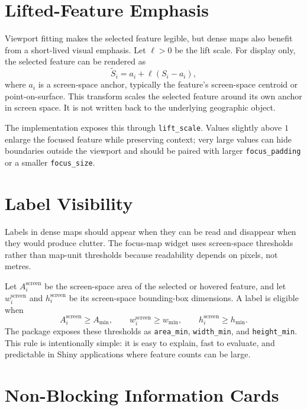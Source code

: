 \documentclass[12pt, a4paper]{article}
\numberwithin{equation}{section}
\newcommand{\screen}{\operatorname{screen}}
\begin{document}
\section{Lifted-Feature Emphasis}

Viewport fitting makes the selected feature legible, but dense maps also benefit from a short-lived visual emphasis. Let $\ell > 0$ be the lift scale. For display only, the selected feature can be rendered as
\begin{equation}
  \widetilde{S}_i = a_i + \ell \left(S_i - a_i\right),
  \label{eq:lift}
\end{equation}
where $a_i$ is a screen-space anchor, typically the feature's screen-space centroid or point-on-surface. This transform scales the selected feature around its own anchor in screen space. It is not written back to the underlying geographic object.

The implementation exposes this through \texttt{lift\_scale}. Values slightly above $1$ enlarge the focused feature while preserving context; very large values can hide boundaries outside the viewport and should be paired with larger \texttt{focus\_padding} or a smaller \texttt{focus\_size}.

\section{Label Visibility}

Labels in dense maps should appear when they can be read and disappear when they would produce clutter. The focus-map widget uses screen-space thresholds rather than map-unit thresholds because readability depends on pixels, not metres.

Let $A_i^{\screen}$ be the screen-space area of the selected or hovered feature, and let $w_i^{\screen}$ and $h_i^{\screen}$ be its screen-space bounding-box dimensions. A label is eligible when
\begin{equation}
  A_i^{\screen} \geq A_{\min}, \qquad
  w_i^{\screen} \geq w_{\min}, \qquad
  h_i^{\screen} \geq h_{\min}.
  \label{eq:label-threshold}
\end{equation}
The package exposes these thresholds as \texttt{area\_min}, \texttt{width\_min}, and \texttt{height\_min}. This rule is intentionally simple: it is easy to explain, fast to evaluate, and predictable in Shiny applications where feature counts can be large.

\section{Non-Blocking Information Cards}
\end{document}

